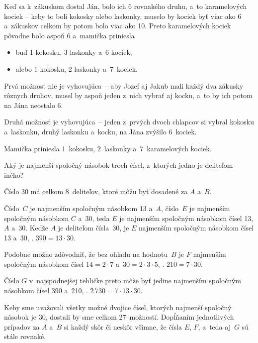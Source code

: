 {%
Keď sa k~zákuskom dostal Ján, bolo ich 6 rovnakého druhu, a~to karamelových kociek --
keby to boli kokosky alebo laskonky, muselo by kociek byť viac ako 6 a~zákuskov celkom by potom bolo viac ako 10.
Preto karamelových kociek pôvodne bolo aspoň 6 a~mamička priniesla
\begin{itemize}
\item buď 1 kokosku, 3 laskonky a~6 kociek,
\item alebo 1 kokosku, 2 laskonky a~7~kociek.
\end{itemize}
Prvá možnosť nie je vyhovujúca~-- aby Jozef aj Jakub mali každý dva zákusky rôznych druhov, musel by aspoň jeden z~nich vybrať aj kocku, a~to by ich potom na Jána neostalo 6.

Druhá možnosť je vyhovujúca~-- jeden z~prvých dvoch chlapcov si vybral kokosku a~laskonku, druhý laskonku a~kocku, na Jána zvýšilo 6~kociek.

Mamička priniesla 1~kokosku, 2~laskonky a~7~karamelových kociek.
}

{%
\napad
Aký je najmenší spoločný násobok troch čísel, z~ktorých jedno je deliteľom iného?

\riesenie
Číslo 30 má celkom 8~deliteľov, ktoré môžu byť dosadené za $A$ a~$B$.
%


Číslo~$C$ je najmenším spoločným násobkom 13 a~$A$, číslo~$E$ je najmenším spoločným násobkom $C$ a~30, teda $E$ je najmenším spoločným násobkom čísel 13, $A$ a~30.
Keďže $A$ je deliteľom čísla~30, je $E$ najmenším spoločným násobkom čísel 13 a~30, \tj. $390=13\cdot 30$.

Podobne možno zdôvodniť, že bez ohľadu na hodnotu~$B$ je $F$ najmenším spoločným násobkom čísel $14=2\cdot7$ a~$30=2\cdot3\cdot5$, \tj. $210=7\cdot30$.

Číslo $G$ v~najspodnejšej tehličke preto môže byť jedine najmenším spoločným násobkom čísel 390 a~210, \tj. $2\,730=7\cdot13\cdot30$.
%


\poznamka
Keby sme uvažovali všetky možné dvojice čísel, ktorých najmenší spoločný násobok je 30, dostali by sme celkom 27~možností.
Dopĺňaním jednotlivých prípadov za $A$ a~$B$ si každý skôr či neskôr všimne, že čísla $E$, $F$, a~teda aj~$G$ sú stále rovnaké.
}

